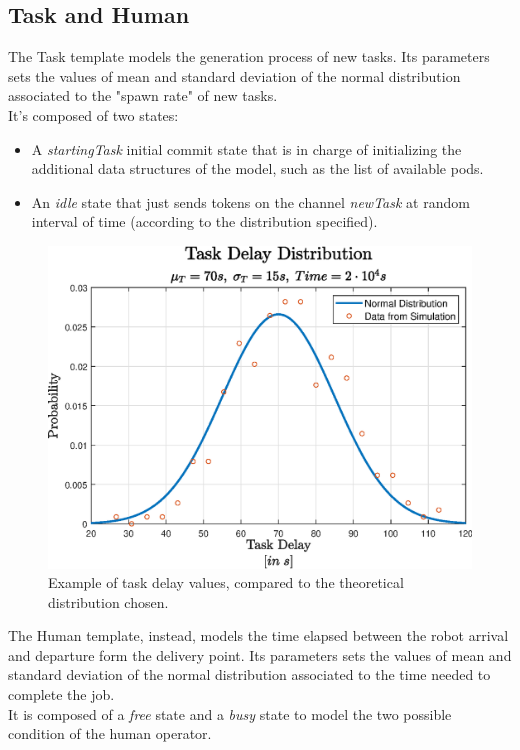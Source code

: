 \documentclass[10pt,a4paper]{article}
\begin{document}
		\subsection{Task and Human}
			The Task template models the generation process of new tasks. Its parameters sets the values of mean and standard deviation of the normal distribution associated to the "spawn rate" of new tasks.\\
			It's composed of two states:
			\begin{itemize}
				\item A \emph{startingTask} initial commit state that is in charge of initializing the additional data structures of the model, such as the list of available pods.
				\item An \emph{idle} state that just sends tokens on the channel \emph{newTask} at random interval of time (according to the distribution specified).
			\end{itemize}
			\begin{figure}[H]
				\centering
				\includegraphics[scale = 0.65]{Images/taskDelay}
				\caption{Example of task delay values, compared to the theoretical distribution chosen.}
			\end{figure}
			The Human template, instead, models the time elapsed between the robot arrival and departure form the delivery point. Its parameters sets the values of mean and standard deviation of the normal distribution associated to the time needed to complete the job.\\
			It is composed of a \emph{free} state and a \emph{busy} state to model the two possible condition of the human operator. 
			
\end{document}
